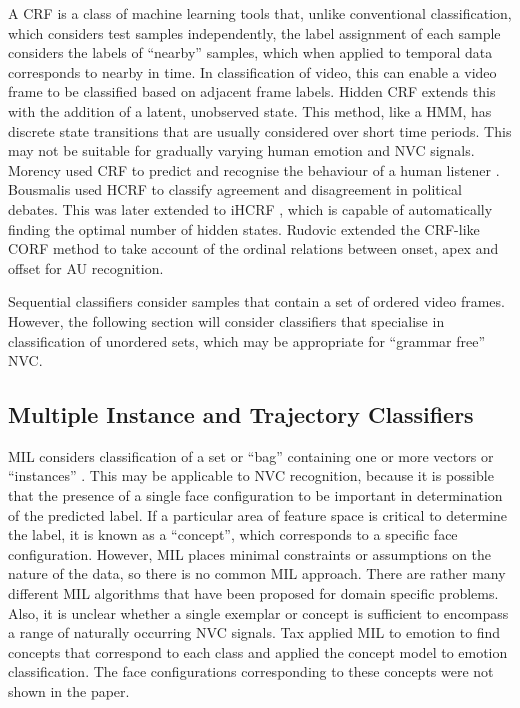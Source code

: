 A \acf{CRF} is a class of machine learning tools that, unlike conventional classification, which considers test samples independently, the label assignment of each sample considers the labels of ``nearby'' samples, which when applied to temporal data corresponds to nearby in time. In classification of video, this can enable a video frame to be classified based on adjacent frame labels. Hidden \ac{CRF} extends this with the addition of a latent, unobserved state. This method, like a \ac{HMM}, has discrete state transitions that are usually considered over short time periods. This may not be suitable for gradually varying human emotion and \ac{NVC} signals. Morency used \ac{CRF} to predict and recognise the behaviour of a human listener \cite{Morency2011}. Bousmalis \etal \cite{Bousmalis2011} used \ac{HCRF} to classify agreement and disagreement in political debates. This was later extended to \ac{iHCRF} \cite{Bousmalis2012}, which is capable of automatically finding the optimal number of hidden states. Rudovic \etal \cite{Rudovic2012} extended the \ac{CRF}-like \ac{CORF} method \cite{Kim2010} to take account of the ordinal relations between onset, apex and offset for \ac{AU} recognition. 


Sequential classifiers consider samples that contain a set of ordered video frames. However, the following section will consider classifiers that specialise in classification of unordered sets, which may be appropriate for ``grammar free'' \ac{NVC}.

\subsection{Multiple Instance and Trajectory Classifiers}

\acf{MIL} considers classification of a set or ``bag'' containing one or more vectors or ``instances'' \cite{Maron1998}. This may be applicable to \ac{NVC} recognition, because it is possible that the presence of a single face configuration to be important in determination of the predicted label. If a particular area of feature space is critical to determine the label, it is known as a ``concept'', which corresponds to a specific face configuration. However, \ac{MIL} places minimal constraints or assumptions on the nature of the data, so there is no common \ac{MIL} approach. There are rather many different \ac{MIL} algorithms that have been proposed for domain specific problems. Also, it is unclear whether a single exemplar or concept is sufficient to encompass a range of naturally occurring \ac{NVC} signals. Tax \etal \cite{Tax2011} applied \ac{MIL} to emotion to find concepts that correspond to each class and applied the concept model to emotion classification. The face configurations corresponding to these concepts were not shown in the paper.

